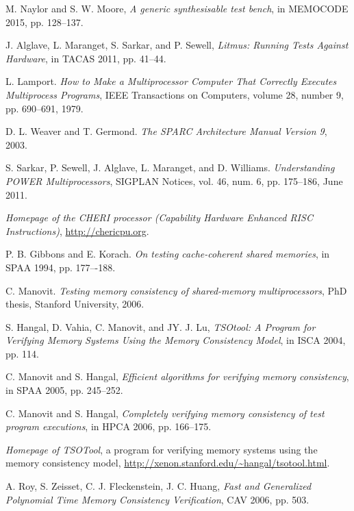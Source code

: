 \documentclass[11pt]{article}
\begin{document}
\begin{thebibliography}{99}
\setlength{\itemsep}{1pt}

 M. Naylor and S. W. Moore, \emph{A generic
synthesisable test bench}, in MEMOCODE 2015, pp. 128--137.

 J. Alglave, L. Maranget, S. Sarkar, and P.
Sewell, \emph{Litmus: Running Tests Against Hardware}, in TACAS 2011,
pp. 41--44.

 L. Lamport.  \emph{How to Make a Multiprocessor Computer
That Correctly Executes Multiprocess Programs}, IEEE Transactions on
Computers, volume 28, number 9, pp. 690--691, 1979.

 D. L. Weaver and T. Germond. \emph{ The SPARC
Architecture Manual Version 9}, 2003.

 S. Sarkar, P. Sewell, J.  Alglave, L. Maranget, and D.
Williams. \emph{Understanding POWER Multiprocessors}, SIGPLAN Notices,
vol. 46, num. 6, pp. 175--186, June 2011.

 \emph{Homepage of the CHERI processor (Capability
Hardware Enhanced RISC Instructions)}, \url{http://chericpu.org}.

 P. B.  Gibbons and E. Korach.  \emph{On testing
cache-coherent shared memories}, in SPAA 1994, pp.  177–-188.

 C. Manovit. \emph{Testing memory consistency of
shared-memory multiprocessors}, PhD thesis, Stanford University, 2006.

 S. Hangal, D. Vahia, C. Manovit, and JY. J. Lu,
\emph{TSOtool: A Program for Verifying Memory Systems Using the Memory
Consistency Model}, in ISCA 2004, pp. 114.

 C. Manovit and S. Hangal, \emph{Efficient
algorithms for verifying memory consistency}, in SPAA 2005, pp.
245--252.

 C. Manovit and S. Hangal, \emph{Completely
verifying memory consistency of test program executions}, in HPCA
2006, pp. 166--175.

 \emph{Homepage of TSOTool}, a program for verifying
memory systems using the memory consistency model,
\url{http://xenon.stanford.edu/~hangal/tsotool.html}.

 A. Roy, S. Zeisset, C. J. Fleckenstein, J. C.
Huang, \emph{Fast and Generalized Polynomial Time Memory Consistency
Verification}, CAV 2006, pp. 503.%


\end{thebibliography}
\end{document}
